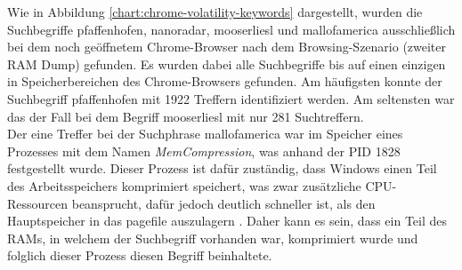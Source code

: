 Wie in Abbildung \ref{chart:chrome-volatility-keywords} dargestellt, wurden die Suchbegriffe \glqq{}pfaffenhofen\grqq{}, \glqq{}nanoradar\grqq{}, \glqq{}mooserliesl\grqq{} und \glqq{}mallofamerica\grqq{} ausschließlich bei dem noch geöffnetem Chrome-Browser nach dem Browsing-Szenario (zweiter RAM Dump) gefunden. Es wurden dabei alle Suchbegriffe bis auf einen einzigen in Speicherbereichen des Chrome-Browsers gefunden. Am häufigsten konnte der Suchbegriff \glqq{}pfaffenhofen\grqq{} mit 1922 Treffern identifiziert werden. Am seltensten war das der Fall bei dem Begriff \glqq{}mooserliesl\grqq{} mit nur 281 Suchtreffern. \\
Der eine Treffer bei der Suchphrase \glqq{}mallofamerica\grqq{} war im Speicher eines Prozesses mit dem Namen \textit{MemCompression}, was anhand der PID 1828 festgestellt wurde. Dieser Prozess ist dafür zuständig, dass Windows einen Teil des Arbeitsspeichers komprimiert speichert, was zwar zusätzliche CPU-Ressourcen beansprucht, dafür jedoch deutlich schneller ist, als den Hauptspeicher in das pagefile auszulagern \cite{MemCompressionWebsite}. Daher kann es sein, dass ein Teil des RAMs, in welchem der Suchbegriff vorhanden war, komprimiert wurde und folglich dieser Prozess diesen Begriff beinhaltete.

